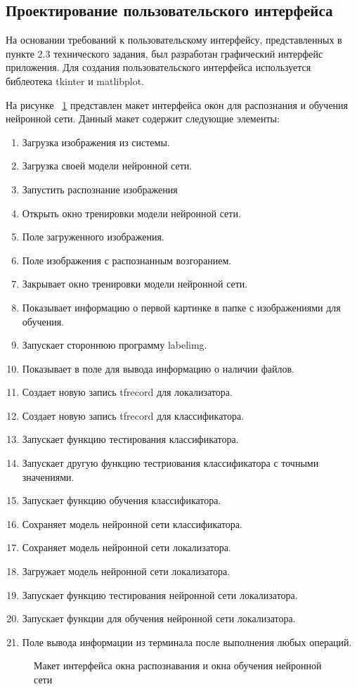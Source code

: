 \subsection{ Проектирование пользовательского интерфейса}
На основании требований к пользовательскому интерфейсу, представленных в пункте 2.3 технического задания, был разработан графический интерфейс приложения. Для создания пользовательского интерфейса используется библеотека tkinter и matlibplot.

На рисунке ~\ref{maketinterface:image} представлен макет интерфейса окон для распознания и обучения нейронной сети. Данный макет содержит следующие элементы:
\begin{enumerate}
\item Загрузка изображения из системы.
\item Загрузка своей модели нейронной сети.
\item Запустить распознание изображения
\item Открыть окно тренировки модели нейронной сети.
\item Поле загруженного изображения.
\item Поле изображения с распознанным возгоранием.
\item Закрывает окно тренировки модели нейронной сети.
\item Показывает информацию о первой картинке в папке с изображениями для обучения.
\item Запускает стороннюю программу labelimg.
\item Показывает в поле для вывода информацию о наличии файлов.
\item Создает новую запись tfrecord для локализатора.
\item Создает новую запись tfrecord для классификатора.
\item Запускает функцию тестирования классификатора.
\item Запускает другую функцию тестриования классификатора с точными значениями.
\item Запускает функцию обучения классификатора.
\item Сохраняет модель нейронной сети классификатора.
\item Сохраняет модель нейронной сети локализатора.
\item Загружает модель нейронной сети локализатора.
\item Запускает функцию тестирования нейронной сети локализатора.
\item Запускает функции для обучения нейронной сети локализатора.
\item Поле вывода информации из терминала после выполнения любых операций.
\end{enumerate}

\begin{figure}[H]
\caption{Макет интерфейса окна распознавания и окна обучения нейронной сети}
\label{maketinterface:image}
\end{figure}
















